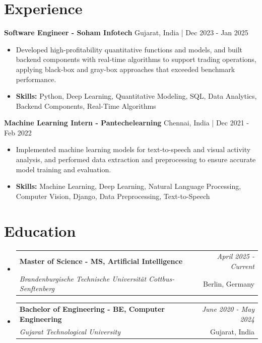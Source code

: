 \documentclass[a4paper,11pt]{article}
\makeatletter
\newcommand{\resumeSubheading}[4]{
\vspace{0.5mm}\item
    \begin{tabular*}{\linewidth}[t]{l@{\extracolsep{\fill}}r}
        \textbf{#1} & \textit{\footnotesize{#4}} \\
        \textit{\footnotesize{#3}} &  \footnotesize{#2}\\
    \end{tabular*}
    \vspace{-2.4mm}
}
\makeatother
\begin{document}
\section{\textbf{Experience}}


\vspace{1mm}
  \textbf{Software Engineer - Soham Infotech} \hfill Gujarat, India | Dec 2023 - Jan 2025
\vspace{-1.5mm} %
\begin{itemize}
  \item Developed high-profitability quantitative functions and models, and built backend components with real-time algorithms to support trading operations, applying black-box and gray-box approaches that exceeded benchmark performance.

\vspace{-2mm}
  \item \textbf{Skills:} Python, Deep Learning, Quantitative Modeling, SQL, Data Analytics, Backend Components, Real-Time Algorithms
\end{itemize}

\vspace{1mm}
  \textbf{Machine Learning Intern - Pantechelearning} \hfill Chennai, India | Dec 2021 - Feb 2022
\vspace{-1.5mm} %
\begin{itemize}
  \item Implemented machine learning models for text-to-speech and visual activity analysis, and performed data extraction and preprocessing to ensure accurate model training and evaluation.
\vspace{-2mm}
  \item \textbf{Skills:} Machine Learning, Deep Learning, Natural Language Processing, Computer Vision, Django, Data Preprocessing, Text-to-Speech
\end{itemize}\section{\textbf{Education}}
\vspace{-0.4mm}

\begin{itemize}[leftmargin=0.15in, label={}]
\resumeSubheading
{Master of Science - MS, Artificial Intelligence }{Berlin, Germany}
{Brandenburgische Technische Universität Cottbus-Senftenberg  }{April 2025 - Current}

\vspace{1.0mm} %
\resumeSubheading
{Bachelor of Engineering - BE, Computer Engineering  }{Gujarat, India}
{Gujarat Technological University }{June 2020 - May 2024}

\end{itemize}
\end{document}
